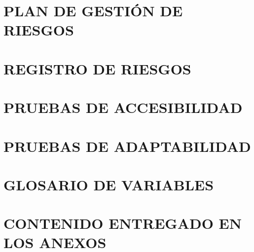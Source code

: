 \section*{PLAN DE GESTIÓN DE RIESGOS}
{}
\hypertarget{anexo:plan_de_gestion_de_riesgos}{}


\newpage
\section*{REGISTRO DE RIESGOS}
{}
\hypertarget{anexo:registro_de_riesgos}{}


\newpage
\section*{PRUEBAS DE ACCESIBILIDAD}
{}


\newpage
\section*{PRUEBAS DE ADAPTABILIDAD}
{}


\newpage
\section*{GLOSARIO DE VARIABLES}
{}


\newpage
\section*{CONTENIDO ENTREGADO EN LOS ANEXOS} 
{}

